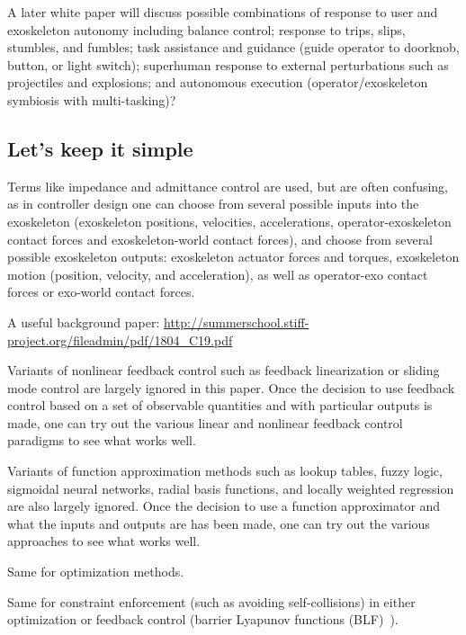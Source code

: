 \documentclass[letterpaper,12pt,fullpage]{article}
\begin{document}
A later white paper will discuss
possible combinations of response to user and exoskeleton
autonomy including balance control; response to trips, slips,
stumbles, and fumbles; task assistance and guidance (guide operator to
doorknob, button, or light switch); superhuman response to external
perturbations such as projectiles and explosions; and autonomous
execution (operator/exoskeleton symbiosis with multi-tasking)?

\subsection{Let's keep it simple}

Terms like impedance and admittance control are used, but are often confusing,
as in controller design one can choose from several possible
inputs into the exoskeleton (exoskeleton positions,
velocities, accelerations, operator-exoskeleton contact forces and
exoskeleton-world contact forces), and choose from several possible exoskeleton
outputs: exoskeleton actuator forces and torques, exoskeleton
motion (position, velocity, and acceleration), as well as operator-exo
contact forces or exo-world contact forces.

A useful background paper: \url{http://summerschool.stiff-project.org/fileadmin/pdf/1804_C19.pdf}

Variants of nonlinear feedback control such as feedback linearization or
sliding mode control are largely ignored in this paper.
Once the decision to use feedback control
based on a set of observable quantities and with particular outputs is made,
one can try out the various linear and nonlinear feedback control paradigms
to see what works well.

Variants of function approximation methods such as lookup tables, fuzzy logic,
sigmoidal neural networks, radial basis functions, and locally weighted regression
are also largely ignored. Once the decision to use a function approximator
and what the inputs and outputs are has been made, one can try out the various
approaches to see what works well.

Same for optimization methods.

Same for constraint enforcement (such as avoiding self-collisions)
in either optimization or feedback control (barrier
Lyapunov functions (BLF)~\cite{IEEE06911561}).
\end{document}
